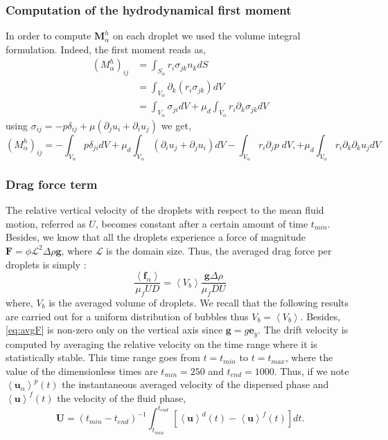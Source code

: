 \subsubsection{Computation of the hydrodynamical first moment}

In order to compute $\bm{M}^h_\alpha$ on each droplet we used the volume integral formulation.
Indeed, the first moment reads as,
\begin{align}
    (M^h_\alpha)_{ij}
    & = \int_{S_\alpha} r_i \sigma_{jk} n_k dS \\
    & = \int_{V_\alpha} \partial_k \left( r_i \sigma_{jk} \right) dV \\
    &= \int_{V_\alpha} \sigma_{ji}  dV
    + \mu_d \int_{V_\alpha} r_i \partial_k\sigma_{jk} dV
\end{align}
using $\sigma_{ij} = -p\delta_{ij} + \mu \left(\partial_j u_i + \partial_i u_j\right)$ we get, 
\begin{equation}
    (M^h_\alpha)_{ij}
    = - \int_{V_\alpha} p\delta_{ji}  dV
    +  \mu_d\int_{V_\alpha} \left(\partial_i u_j+\partial_j u_i\right)dV
    - \int_{V_\alpha} r_i \partial_j p \;dV,
    + \mu_d \int_{V_\alpha} r_i \partial_k\partial_k u_j dV
\end{equation} 

\subsubsection{Drag force term}
The relative vertical velocity of the droplets with respect to the mean fluid motion, referred as $U$, becomes constant after a certain amount of time $t_{min}$.
Besides, we know that all the droplets experience a force of magnitude $\bm{F} = \phi \mathcal{L}^2 \Delta \rho \bm{g}$, where $\mathcal{L}$ is the domain size.
Thus, the averaged drag force per droplets is simply :
\begin{equation}
    \frac{\left<\bm{f}_\alpha\right>}{\mu_f UD} = \left<V_b\right>\frac{\bm{g}\Delta \rho }{\mu_f D U}
    \label{eq:avgF}
\end{equation}  
where, $V_b$ is the averaged volume of droplets. 
We recall that the following results are carried out for a uniform distribution of bubbles thus $V_b = \left<V_b\right>$.
Besides, \ref{eq:avgF} is non-zero only on the vertical axis since $\bm{g} = g \bm{e}_y$. 
The drift velocity is computed by averaging the relative velocity on the time range where it is statistically stable.
This time range goes from $t = t_{min}$ to $t = t_{max}$, where the value of the dimensionless times are $t_{min} = 250$ and $t_{end} = 1000$. 
Thus, if we note $\left<\bm{u}_\alpha\right>^p(t)$ the instantaneous averaged velocity of the dispersed phase and $\left<\bm{u}\right>^f(t)$ the velocity of the fluid phase,
\begin{equation}
    \bm{U} =\left(t_{min}-t_{end}\right)^{-1}\int_{t_{min}}^{t_{end}}\left[\left<\bm{u}\right>^d(t)-\left<\bm{u}\right>^f(t)\right] dt.
\end{equation}

